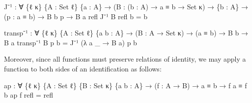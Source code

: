 \documentclass[
  12pt]{article}
\newenvironment{Shaded}{\begin{snugshade}}{\end{snugshade}}
\newcommand{\DataTypeTok}[1]{\textcolor[rgb]{0.00,0.34,0.68}{#1}}
\newcommand{\NormalTok}[1]{\textcolor[rgb]{0.12,0.11,0.11}{#1}}
\newcommand{\OtherTok}[1]{\textcolor[rgb]{0.00,0.43,0.16}{#1}}
\begin{document}
\begin{Shaded}
\begin{Highlighting}[]
\NormalTok{    J⁻¹ }\OtherTok{:} \OtherTok{∀} \OtherTok{\{}\NormalTok{ℓ κ}\OtherTok{\}} \OtherTok{\{}\NormalTok{A }\OtherTok{:} \DataTypeTok{Set}\NormalTok{ ℓ}\OtherTok{\}} \OtherTok{\{}\NormalTok{a }\OtherTok{:}\NormalTok{ A}\OtherTok{\}}
          \OtherTok{→} \OtherTok{(}\NormalTok{B }\OtherTok{:} \OtherTok{(}\NormalTok{b }\OtherTok{:}\NormalTok{ A}\OtherTok{)} \OtherTok{→}\NormalTok{ a ≡ b }\OtherTok{→} \DataTypeTok{Set}\NormalTok{ κ}\OtherTok{)}
          \OtherTok{→} \OtherTok{\{}\NormalTok{b }\OtherTok{:}\NormalTok{ A}\OtherTok{\}} \OtherTok{→} \OtherTok{(}\NormalTok{p }\OtherTok{:}\NormalTok{ a ≡ b}\OtherTok{)} \OtherTok{→}\NormalTok{ B b p }\OtherTok{→}\NormalTok{ B a refl}
\NormalTok{    J⁻¹ B refl b }\OtherTok{=}\NormalTok{ b}

\NormalTok{    transp⁻¹ }\OtherTok{:} \OtherTok{∀} \OtherTok{\{}\NormalTok{ℓ κ}\OtherTok{\}} \OtherTok{\{}\NormalTok{A }\OtherTok{:} \DataTypeTok{Set}\NormalTok{ ℓ}\OtherTok{\}} \OtherTok{\{}\NormalTok{a b }\OtherTok{:}\NormalTok{ A}\OtherTok{\}} 
               \OtherTok{→} \OtherTok{(}\NormalTok{B }\OtherTok{:}\NormalTok{ A }\OtherTok{→} \DataTypeTok{Set}\NormalTok{ κ}\OtherTok{)} \OtherTok{→} \OtherTok{(}\NormalTok{a ≡ b}\OtherTok{)} \OtherTok{→}\NormalTok{ B b }\OtherTok{→}\NormalTok{ B a}
\NormalTok{    transp⁻¹ B p b }\OtherTok{=}\NormalTok{ J⁻¹ }\OtherTok{(λ}\NormalTok{ a }\OtherTok{\_} \OtherTok{→}\NormalTok{ B a}\OtherTok{)}\NormalTok{ p b}
\end{Highlighting}
\end{Shaded}

Moreover, since all functions must preserve relations of identity, we
may apply a function to both sides of an identification as follows:

\begin{Shaded}
\begin{Highlighting}[]
\NormalTok{    ap }\OtherTok{:} \OtherTok{∀} \OtherTok{\{}\NormalTok{ℓ κ}\OtherTok{\}} \OtherTok{\{}\NormalTok{A }\OtherTok{:} \DataTypeTok{Set}\NormalTok{ ℓ}\OtherTok{\}} \OtherTok{\{}\NormalTok{B }\OtherTok{:} \DataTypeTok{Set}\NormalTok{ κ}\OtherTok{\}} \OtherTok{\{}\NormalTok{a b }\OtherTok{:}\NormalTok{ A}\OtherTok{\}}
         \OtherTok{→} \OtherTok{(}\NormalTok{f }\OtherTok{:}\NormalTok{ A }\OtherTok{→}\NormalTok{ B}\OtherTok{)} \OtherTok{→}\NormalTok{ a ≡ b }\OtherTok{→}\NormalTok{ f a ≡ f b}
\NormalTok{    ap f refl }\OtherTok{=}\NormalTok{ refl}
\end{Highlighting}
\end{Shaded}
\end{document}
